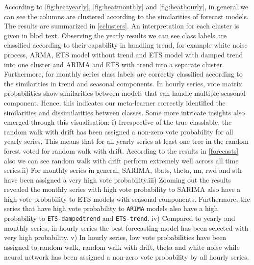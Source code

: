 \documentclass[11pt,a4paper,]{article}
\begin{document}
According to \autoref{fig:heatyearly}, \autoref{fig:heatmonthly} and \autoref{fig:heathourly}, in general we can see the columns are clustered according to the similarities of forecast models. The results are summarized in \autoref{cclusters}. An interpretation for each cluster is given in blod text. Observing the yearly results we can see class labels are classified according to their capability in handling trend, for example white noise process, ARMA, ETS model without trend and ETS model with damped trend into one cluster and ARIMA and ETS with trend into a separate cluster. Furthermore, for monthly series class labels are correctly classified according to the similarities in trend and seasonal components. In hourly series, vote matrix probabilities show similarities between models that can handle multiple seasonal component. Hence, this indicates our meta-learner correctly identified the similarities and dissimilarities between classes. Some more intricate insights also
emerged through this visualisation: \newline i) Irrespective of the true classlable, the random walk with drift has been assigned a non-zero vote probability for all yearly series. This means that for all yearly series at least one tree in the random forest voted for random walk with drift. According to the results in \autoref{forecasts} also we can see random walk with drift perform extremely well across all time series.\newline ii) For monthly series in general, SARIMA, tbats, theta, nn, rwd and stlr have been assigned a very high vote probability.\newline iii) Zooming out the results revealed the monthly series with high vote probability to SARIMA also have a high vote probability to ETS models with seasonal components. Furthermore, the series that have high vote probability to \texttt{ARIMA} models also have a high probability to \texttt{ETS-dampedtrend} and \texttt{ETS-trend}. \newline iv) Compared to yearly and monthly series, in hourly series the best forecasting model has been selected with very high probability. \newline v) In hourly series, low vote probabilities have been assigned to random walk, random walk with drift, theta and white noise while neural network has been assigned a non-zero vote probability by all hourly series.
\end{document}
